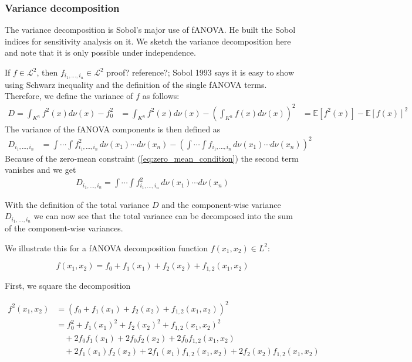 \subsubsection*{Variance decomposition}
The variance decomposition is Sobol's major use of fANOVA. He built the Sobol indices for sensitivity analysis on it. We sketch the variance decomposition here and note that it is only possible under independence.\par
If $f \in \mathcal{L}^2$, then $f_{i_{1}, \dots, i_{n}} \in \mathcal{L}^2$ {\color{blue}proof? reference?; Sobol 1993 says it is easy to show using Schwarz inequality and the definition of the single fANOVA terms.}
Therefore, we define the variance of $f$ as follows:
\begin{align*}
    D = \int_{K^n} f^2(x)d\nu (x) - f^2_{0} &= \int_{K^n} f^2(x)d\nu (x) - (\int_{K^n} f(x)d\nu (x))^2 &= \mathbb{E}[f^2(x)] - \mathbb{E}[f(x)]^2
    \label{variance_whole}
\end{align*}
The variance of the fANOVA components is then defined as
\begin{align*}
    D_{i_{1}, \dots, i_{n}} 
    &= \int \cdots \int f^2_{i_{1}, \dots, i_{n}} \, d\nu(x_1) \cdots d\nu(x_n) - \left( \int \cdots \int f_{i_{1}, \dots, i_{n}} \, d\nu(x_1) \cdots d\nu(x_n) \right)^2
\end{align*}
Because of the zero-mean constraint (\autoref{eq:zero_mean_condition}) the second term vanishes and we get
\begin{align*}
    D_{i_{1}, \dots, i_{n}} = \int \cdots \int f^2_{i_{1}, \dots, i_{n}} \, d\nu(x_1) \cdots d\nu(x_n)
\end{align*}

With the definition of the total variance $D$ and the component-wise variance $D_{i_{1}, \dots, i_{n}}$ we can now see that the total variance can be decomposed into the sum of the component-wise variances.

We illustrate this for a fANOVA decomposition function \( f(x_1, x_2) \in L^2 \):

\[
f(x_1, x_2) = f_0 + f_1(x_1) + f_2(x_2) + f_{1,2}(x_1, x_2)
\]

\vspace{1em}

First, we square the decomposition

\begin{align*}
f^2(x_1, x_2) &= \left(f_0 + f_1(x_1) + f_2(x_2) + f_{1,2}(x_1, x_2)\right)^2 \\
&= f_0^2 + f_1(x_1)^2 + f_2(x_2)^2 + f_{1,2}(x_1, x_2)^2 \\
&\quad + 2f_0 f_1(x_1) + 2f_0 f_2(x_2) + 2f_0 f_{1,2}(x_1, x_2) \\
&\quad + 2f_1(x_1) f_2(x_2) + 2f_1(x_1) f_{1,2}(x_1, x_2) + 2f_2(x_2) f_{1,2}(x_1, x_2)
\end{align*}

